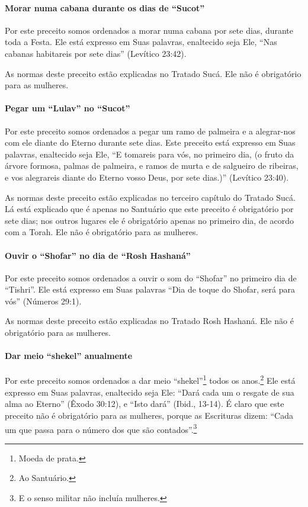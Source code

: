 \paragraph{Morar numa cabana durante os dias de ``Sucot''}

Por este preceito somos ordenados a morar numa cabana por sete dias,
durante toda a Festa. Ele está expresso em Suas palavras, enaltecido
seja Ele, ``Nas cabanas habitareis por sete dias'' (Levítico 23:42).

As normas deste preceito estão explicadas no Tratado Sucá. Ele não é
obrigatório para as mulheres.

\paragraph{Pegar um ``Lulav'' no ``Sucot''}

Por este preceito somos ordenados a pegar um ramo de palmeira e a
alegrar-nos com ele diante do Eterno durante sete dias. Este preceito
está expresso em Suas palavras, enaltecido seja Ele, ``E tomareis para
vós, no primeiro dia, (o fruto da árvore formosa, palmas de palmeira, e
ramos de murta e de salgueiro de ribeiras, e vos alegrareis diante do
Eterno vosso Deus, por sete dias.)'' (Levítico 23:40).

As normas deste preceito estão explicadas no terceiro capítulo do
Tratado Sucá. Lá está explicado que é apenas no Santuário que este
preceito é obrigatório por sete dias; nos outros lugares ele é
obrigatório apenas no primeiro dia, de acordo com a Torah. Ele não é
obrigatório para as mulheres.

\paragraph{Ouvir o ``Shofar'' no dia de ``Rosh Hashaná''}

Por este preceito somos ordenados a ouvir o som do ``Shofar'' no
primeiro dia de ``Tishri''. Ele está expresso em Suas palavras ``Dia de
toque do Shofar, será para vós'' (Números 29:1).

As normas deste preceito estão explicadas no Tratado Rosh Hashaná. Ele
não é obrigatório para as mulheres.

\paragraph{Dar meio ``shekel'' anualmente}

Por este preceito somos ordenados a dar meio
``shekel''\footnote{Moeda de prata.} todos os anos.\footnote{Ao Santuário.}
Ele está expresso em Suas palavras, enaltecido seja Ele: ``Dará cada um
o resgate de sua alma ao Eterno'' (Êxodo 30:12), e ``Isto dará'' (Ibid.,
13-14). É claro que este preceito não é obrigatório para as mulheres,
porque as Escrituras dizem: ``Cada um que passa para o número dos que
são contados''.\footnote{E o senso militar não incluía mulheres.}

